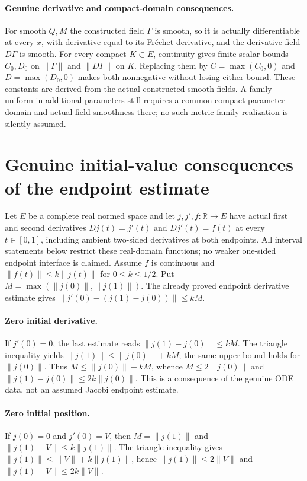 \documentclass[11pt]{article}
\theoremstyle{definition}
\theoremstyle{remark}
\numberwithin{equation}{section}
\begin{document}
\paragraph{Genuine derivative and compact-domain consequences.}
For smooth $Q,M$ the constructed field $\Gamma$ is smooth, so it is
actually differentiable at every $x$, with derivative equal to its
Fr\'echet derivative, and the derivative field $D\Gamma$ is smooth.
For every compact $K\subset E$, continuity gives finite scalar bounds
$C_0,D_0$ on $\|\Gamma\|$ and $\|D\Gamma\|$ on $K$. Replacing them
by $C=\max(C_0,0)$ and $D=\max(D_0,0)$ makes both nonnegative without
losing either bound. These constants are derived from the actual
constructed smooth fields. A family uniform in additional parameters
still requires a common compact parameter domain and actual field
smoothness there; no such metric-family realization is silently assumed.

\clearpage
\section{Genuine initial-value consequences of the endpoint estimate}
Let $E$ be a complete real normed space and let $j,j',f:\mathbb R\to E$ have
actual first and second derivatives $Dj(t)=j'(t)$ and $Dj'(t)=f(t)$ at
every $t\in[0,1]$, including ambient two-sided derivatives at both endpoints.
All interval statements below restrict these real-domain functions; no weaker
one-sided endpoint interface is claimed. Assume $f$ is continuous and $\|f(t)\|\le k\|j(t)\|$ for
$0\le k\le1/2$. Put $M=\max(\|j(0)\|,\|j(1)\|)$.
The already proved endpoint derivative estimate gives
$\|j'(0)-(j(1)-j(0))\|\le kM$.

\paragraph{Zero initial derivative.}
If $j'(0)=0$, the last estimate reads $\|j(1)-j(0)\|\le kM$.
The triangle inequality yields $\|j(1)\|\le\|j(0)\|+kM$; the same
upper bound holds for $\|j(0)\|$. Thus $M\le\|j(0)\|+kM$, whence
$M\le2\|j(0)\|$ and
$\|j(1)-j(0)\|\le2k\|j(0)\|$. This is a consequence of the genuine
ODE data, not an assumed Jacobi endpoint estimate.

\paragraph{Zero initial position.}
If $j(0)=0$ and $j'(0)=V$, then $M=\|j(1)\|$ and
$\|j(1)-V\|\le k\|j(1)\|$. The triangle inequality gives
$\|j(1)\|\le\|V\|+k\|j(1)\|$, hence $\|j(1)\|\le2\|V\|$ and
$\|j(1)-V\|\le2k\|V\|$.
\end{document}
